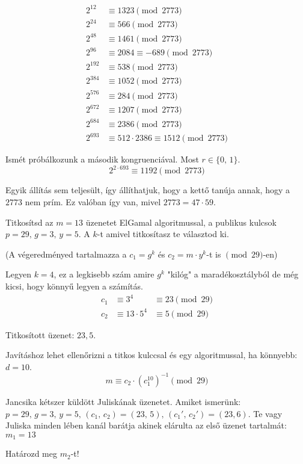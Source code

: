 \begin{solution}
\begin{align*}
2^{12} & \equiv1323\pmod{2773}\\
2^{24} & \equiv566\pmod{2773}\\
2^{48} & \equiv1461\pmod{2773}\\
2^{96} & \equiv2084\equiv-689\pmod{2773}\\
2^{192} & \equiv538\pmod{2773}\\
2^{384} & \equiv1052\pmod{2773}\\
2^{576} & \equiv284\pmod{2773}\\
2^{672} & \equiv1207\pmod{2773}\\
2^{684} & \equiv2386\pmod{2773}\\
2^{693} & \equiv512\cdot2386\equiv1512\pmod{2773}
\end{align*}

Ismét próbálkozunk a második kongruenciával. Most $r\in\{0,\,1\}$.
\[
2^{2\cdot693}\equiv1192\pmod{2773}
\]

Egyik állítás sem teljesült, így állíthatjuk, hogy a kettő tanúja
annak, hogy a $2773$ nem prím. Ez valóban így van, mivel $2773=47\cdot59$.
\end{solution}
\begin{problem}
Titkosítsd az $m=13$ üzenetet ElGamal algoritmussal, a publikus kulcsok
$p=29,\,g=3,\,y=5$. A $k$-t amivel titkosítasz te választod ki.

(A végeredményed tartalmazza a $c_{1}=g^{k}$ és $c_{2}=m\cdot y^{k}$-t
is $\pmod{29}$-en) 
\end{problem}

\begin{solution}
\hspace{0em}\vspace{1em}

Legyen $k=4$, ez a legkisebb szám amire $g^{k}$ "kilóg" a maradékosztályból
de még kicsi, hogy könnyű legyen a számítás. 
\begin{align*}
c_{1} & \equiv3^{4} & \equiv23\pmod{29}\\
c_{2} & \equiv13\cdot5^{4} & \equiv5\pmod{29}
\end{align*}

Titkosított üzenet: $23,5$.

Javításhoz lehet ellenőrizni a titkos kulccsal és egy algoritmussal,
ha könnyebb: $d=10$. 
\[
m\equiv c_{2}\cdot(c_{1}^{10})^{-1}\pmod{29}
\]
\end{solution}
\begin{problem}Jancsika kétszer küldött Juliskának üzenetet. Amiket ismerünk: $p=29,\,g=3,\,y=5,\,(c_{1},\,c_{2})=(23,\,5),\,(c_{1}',\,c_{2}')=(23,6)$.
Te vagy Juliska minden lében kanál barátja akinek elárulta az első
üzenet tartalmát: $m_{1}=13$

Határozd meg $m_{2}$-t! 
\end{problem}

